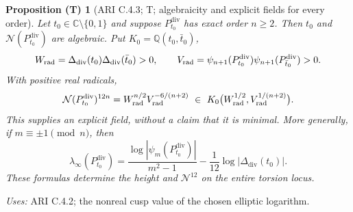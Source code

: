 \documentclass[11pt,a4paper]{article}
\theoremstyle{plain}
\newtheorem{proposition}[theorem]{Proposition (T)}
\theoremstyle{definition}
\begin{document}
\begin{proposition}[ARI C.4.3; T; algebraicity and explicit fields for every order]\label{ari:C.4.3}
Let $t_0\in\mathbb C\setminus\{0,1\}$ and suppose $P^{\mathrm{div}}_{t_0}$ has
exact order $n\ge2$. Then $t_0$ and $\mathcal N(P^{\mathrm{div}}_{t_0})$ are algebraic.
Put $K_0=\mathbb Q(t_0,\bar t_0)$,
\[
 W_{\rm rad}=\Delta_{\mathrm{div}}(t_0)\Delta_{\mathrm{div}}(\bar t_0)>0,\qquad
 V_{\rm rad}=\psi_{n+1}(P^{\mathrm{div}}_{t_0})\psi_{n+1}(P^{\mathrm{div}}_{\bar t_0})>0.
\]
With positive real radicals,
\[
 \mathcal N(P^{\mathrm{div}}_{t_0})^{12n}=W_{\rm rad}^{n/2}V_{\rm rad}^{-6/(n+2)}
 \ \in\ K_0\bigl(W_{\rm rad}^{1/2},V_{\rm rad}^{1/(n+2)}\bigr).
\]
This supplies an explicit field, without a claim that it is minimal.
More generally, if $m\equiv\pm1\pmod n$, then
\[
 \lambda_\infty(P^{\mathrm{div}}_{t_0})
 =\frac{\log|\psi_m(P^{\mathrm{div}}_{t_0})|}{m^2-1}
       -\frac1{12}\log|\Delta_{\mathrm{div}}(t_0)|.
\]
These formulas determine the height and $\mathcal N^{12}$ on the entire
torsion locus.
\end{proposition}
\noindent\textit{Uses:} ARI C.4.2; the nonreal cusp value of the chosen elliptic logarithm.\par
\end{document}
